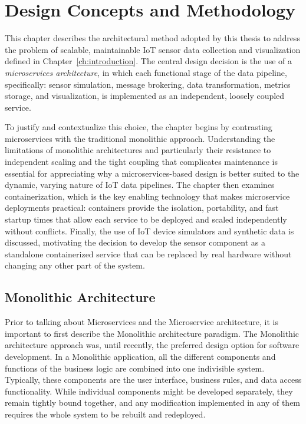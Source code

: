 \chapter{Design Concepts and Methodology} \label{ch:design_concepts}

This chapter describes the architectural method adopted by this thesis to address the problem of scalable, maintainable IoT sensor data collection and visualization defined in Chapter~\ref{ch:introduction}. The central design decision is the use of a \textit{microservices architecture}, in which each functional stage of the data pipeline, specifically: sensor simulation, message brokering, data transformation, metrics storage, and visualization, is implemented as an independent, loosely coupled service.

To justify and contextualize this choice, the chapter begins by contrasting microservices with the traditional monolithic approach. Understanding the limitations of monolithic architectures and particularly their resistance to independent scaling and the tight coupling that complicates maintenance is essential for appreciating why a microservices-based design is better suited to the dynamic, varying nature of IoT data pipelines. The chapter then examines containerization, which is the key enabling technology that makes microservice deployments practical: containers provide the isolation, portability, and fast startup times that allow each service to be deployed and scaled independently without conflicts. Finally, the use of IoT device simulators and synthetic data is discussed, motivating the decision to develop the sensor component as a standalone containerized service that can be replaced by real hardware without changing any other part of the system.

\section{Monolithic Architecture}
 
Prior to talking about Microservices and the Microservice architecture, it is important to first describe the Monolithic architecture paradigm. The Monolithic architecture approach was, until recently, the preferred design option for software development. In a Monolithic application, all the different components and functions of the business logic are combined into one indivisible system\cite{monovsmicro}. Typically, these components are the user interface, business rules, and data access functionality. While individual components might be developed separately, they remain tightly bound together\cite{whatismono}, and any modification implemented in any of them requires the whole system to be rebuilt and redeployed\cite{app10175797}.

